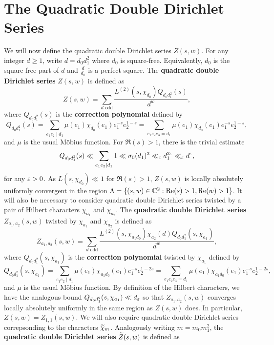 \documentclass[12pt,reqno,oneside]{amsart}
\begin{document}
\section*{The Quadratic Double Dirichlet Series}
    We will now define the quadratic double Dirichlet series $Z(s,w)$. For any integer $d \ge 1$, write $d = d_{0}d_{1}^{2}$ where $d_{0}$ is square-free. Equivalently, $d_{0}$ is the square-free part of $d$ and $\frac{d}{d_{0}}$ is a perfect square. The \textbf{quadratic double Dirichlet series} $Z(s,w)$ is defined as
    \[
        Z(s,w) = \sum_{\text{$d$ odd}}\frac{L^{(2)}(s,\chi_{d_{0}})Q_{d_{0}d_{1}^{2}}(s)}{d^{w}},
    \]
    where $Q_{d_{0}d_{1}^{2}}(s)$ is the \textbf{correction polynomial} defined by
    \[
        Q_{d_{0}d_{1}^{2}}(s) = \sum_{e_{1}e_{2} \mid d_{1}}\mu(e_{1})\chi_{d_{0}}(e_{1})e_{1}^{-s}e_{2}^{1-s} = \sum_{e_{1}e_{2}e_{3} = d_{1}}\mu(e_{1})\chi_{d_{0}}(e_{1})e_{1}^{-s}e_{2}^{1-s},
    \]
    and $\mu$ is the usual M\"obius function. For $\Re(s) > 1$, there is the trivial estimate
    \[
        Q_{d_{0}d_{1}^{2}}(s) \ll \sum_{e_{1}e_{2} \mid d_{1}}1 \ll \sigma_{0}(d_{1})^{2} \ll_{\varepsilon} d_{1}^{2\varepsilon} \ll_{\varepsilon} d^{\varepsilon},
    \]
     for any $\varepsilon > 0$. As $L(s,\chi_{d_{0}}) \ll 1$ for $\Re(s) > 1$, $Z(s,w)$ is locally absolutely uniformly convergent in the region $\Lambda = \{(s,w) \in \mathbb{C}^{2}:\mathrm{Re}(s) > 1, \mathrm{Re}(w) > 1\}$. It will also be necessary to consider quadratic double Dirichlet series twisted by a pair of Hilbert characters $\chi_{a_{1}}$ and $\chi_{a_{2}}$. The \textbf{quadratic double Dirichlet series} $Z_{a_{1},a_{2}}(s,w)$ twisted by $\chi_{a_{1}}$ and $\chi_{a_{2}}$ is defined as
    \[
        Z_{a_{1},a_{2}}(s,w) = \sum_{\text{$d$ odd}}\frac{L^{(2)}(s,\chi_{a_{1}d_{0}})\chi_{a_{2}}(d)Q_{d_{0}d_{1}^{2}}(s,\chi_{a_{1}})}{d^{w}},
    \]
    where $Q_{d_{0}d_{1}^{2}}(s,\chi_{a_{1}})$ is the \textbf{correction polynomial} twisted by $\chi_{a_{1}}$ defined by
    \[
        Q_{d_{0}d_{1}^{2}}(s,\chi_{a_{1}}) = \sum_{e_{1}e_{2} \mid d_{1}}\mu(e_{1})\chi_{a_{1}d_{0}}(e_{1})e_{1}^{-s}e_{2}^{1-2s} = \sum_{e_{1}e_{2}e_{3} = d_{1}}\mu(e_{1})\chi_{a_{1}d_{0}}(e_{1})e_{1}^{-s}e_{2}^{1-2s},
    \]
    and $\mu$ is the usual M\"obius function. By definition of the Hilbert characters, we have the analogous bound $Q_{d_{0}d_{1}^{2}}(s,\chi_{a_{1}}) \ll d_{\varepsilon}$ so that $Z_{a_{1},a_{2}}(s,w)$ converges locally absolutely uniformly in the same region as $Z(s,w)$ does. In particular, $Z(s,w) = Z_{1,1}(s,w)$. We will also require quadratic double Dirichlet series correpsonding to the characters $\widetilde{\chi}_{m}$. Analogously writing $m = m_{0}m_{1}^{2}$, the \textbf{quadratic double Dirichlet series} $\widetilde{Z}(s,w)$ is defined as
\end{document}
